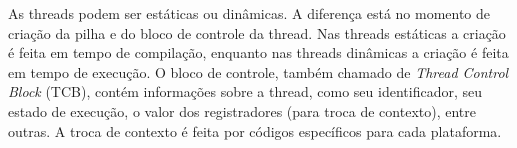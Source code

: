 As threads podem ser estáticas ou dinâmicas. A diferença está no momento de criação da pilha e do bloco de controle da
thread. Nas threads estáticas a criação é feita em tempo de compilação, enquanto nas threads dinâmicas 
a criação é feita em tempo de execução. O bloco de controle, também chamado de
\textit{Thread Control Block} (TCB), contém informações sobre a thread, como seu identificador, seu estado de
execução, o valor dos registradores (para troca de contexto), entre outras\cite{TEP134}.
A troca de contexto é feita por códigos específicos para cada plataforma. 

